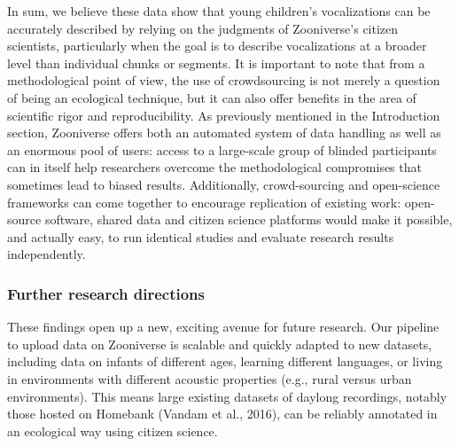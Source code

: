 \documentclass[english,,man]{apa6}
\begin{document}
In sum, we believe these data show that young children's vocalizations can be accurately described by relying on the judgments of Zooniverse's citizen scientists, particularly when the goal is to describe vocalizations at a broader level than individual chunks or segments. It is important to note that from a methodological point of view, the use of crowdsourcing is not merely a question of being an ecological technique, but it can also offer benefits in the area of scientific rigor and reproducibility. As previously mentioned in the Introduction section, Zooniverse offers both an automated system of data handling as well as an enormous pool of users: access to a large-scale group of blinded participants can in itself help researchers overcome the methodological compromises that sometimes lead to biased results. Additionally, crowd-sourcing and open-science frameworks can come together to encourage replication of existing work: open-source software, shared data and citizen science platforms would make it possible, and actually easy, to run identical studies and evaluate research results independently.

\hypertarget{further-research-directions}{%
\subsubsection{Further research directions}\label{further-research-directions}}

These findings open up a new, exciting avenue for future research. Our pipeline to upload data on Zooniverse is scalable and quickly adapted to new datasets, including data on infants of different ages, learning different languages, or living in environments with different acoustic properties (e.g., rural versus urban environments). This means large existing datasets of daylong recordings, notably those hosted on Homebank (Vandam et al., 2016), can be reliably annotated in an ecological way using citizen science.
\end{document}
